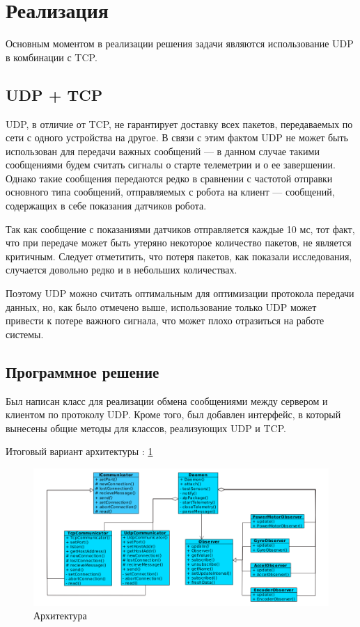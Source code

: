 \documentclass[14pt]{matmex-diploma-custom.cls}
\begin{document}
\section{Реализация} 
Основным моментом в реализации решения задачи являются использование UDP в комбинации с TCP.
\subsection{UDP + TCP}
UDP, в отличие от TCP, не гарантирует доставку всех пакетов, передаваемых по сети с одного устройства на другое. В связи с этим фактом UDP не может быть использован для передачи важных сообщений --- в данном случае такими сообщениями будем считать сигналы о старте телеметрии и о ее завершении. Однако такие сообщения передаются редко в сравнении с частотой отправки основного типа сообщений, отправляемых с робота на клиент --- сообщений, содержащих в себе показания датчиков робота. 

Так как сообщение с показаниями датчиков отправляется каждые 10 мс, тот факт, что при передаче может быть утеряно некоторое количество пакетов, не является критичным. Следует отметитить, что потеря пакетов, как показали исследования, случается довольно редко и в небольших количествах.

Поэтому UDP можно считать оптимальным для оптимизации протокола передачи данных, но, как было отмечено выше, использование только UDP может привести к потере важного сигнала, что может плохо отразиться на работе системы.

\subsection{Программное решение}
Был написан класс для реализации обмена сообщениями между сервером и клиентом по протоколу UDP. Кроме того, был добавлен интерфейс, в который вынесены общие методы для классов, реализующих UDP и TCP.

Итоговый вариант архитектуры \cite{gof}: \ref{overflow1}
\begin{figure}
\centering
\includegraphics[width=\textwidth]{serv.png}
\caption{Архитектура \label{overflow1}}
\end{figure}
\end{document}
